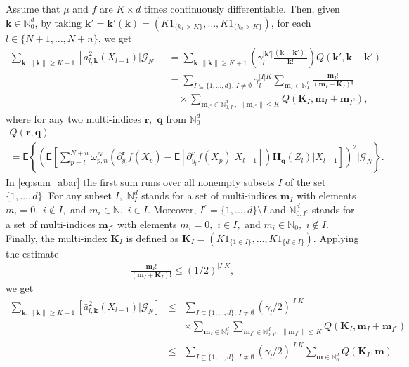 \documentclass[aap,preprint]{imsart}
\begin{document}
Assume that $\mu$ and $f$ are $K\times d$ times continuously differentiable.
Then, given $\mathbf k\in\mathbb N_0^d$,
by taking $\mathbf k'= \mathbf k'(\mathbf k)
=(K1_{\{k_1>K\}},\ldots,K1_{\{k_d>K\}})$,
for each $l\in\{N+1,\ldots,N+n\}$, we get
\begin{align}
\label{eq:sum_abar}
\sum_{\mathbf{k}\colon\|\mathbf{k}\|\geq K+1}\left[\bar{a}_{l,\mathbf{k}}^{2}(X_{l-1})|\mathcal{G}_{N}\right] & =\sum_{\mathbf{k}\colon\|\mathbf{k}\|\geq K+1}\left(\gamma_{l}^{|\mathbf{k}'|}\frac{(\mathbf{k}-\mathbf{k}')!}{\mathbf{k}!}\right)Q(\mathbf{k}',\mathbf{k}-\mathbf{k}')\\
\nonumber
 & =\sum_{I\subseteq\{1,\ldots,d\},\, I\neq \emptyset}\gamma_{l}^{|I|K}\sum_{\mathbf{m}_{I}\in\mathbb{N}_{I}^{d}}\frac{\mathbf{m}_{I}!}{\left(\mathbf{m}_{I}+\mathbf{K}_{I}\right)!}
 \\
 \nonumber
 & \hspace{1em}\times\sum_{\mathbf{m}_{I^c}\in \mathbb{N}^d_{0,I^c},\,\|\mathbf{m}_{I^c}\|\leq K}Q(\mathbf{\mathbf{K}}_{I},\mathbf{m}_{I}+\mathbf{m}_{I^c}),
\end{align}
where for any two multi-indices \(\mathbf{r},\) \(\mathbf{q}\) from \(\mathbb{N}_0^d\)
\begin{multline*}
Q(\mathbf{r},\mathbf{q})
\\
=\mathsf{E}\left\{
\left(\mathsf{E}\left[\sum_{p=l}^{N+n}\omega_{p,n}^{N}\left(\partial_{y_{l}}^{\mathbf r}f\left(X_{p}\right)-\mathsf{E}\left[\partial_{y_{l}}^{\mathbf r}f\left(X_{p}\right)|X_{l-1}\right]\right)\mathbf{H}_{\mathbf{q}}(Z_{l})\Big|X_{l-1}\right]\right)^{2}
\Bigg|\mathcal G_N \right\}.
\end{multline*}
In \eqref{eq:sum_abar} the first sum runs over all nonempty subsets $I$ of the set $\{1,\ldots,d\}.$
For any subset $I,$ $\mathbb{N}_{I}^{d}$ stands for a set
of multi-indices $\mathbf{m}_{I}$ with elements $m_{i}=0,$ $i\not\in I,$
and $m_{i}\in\mathbb{N},$  $i\in I.$ Moreover, \(I^c=\{1,\ldots,d\}\setminus I\) and \(\mathbb{N}^d_{0,I^c}\) stands for a set
of multi-indices $\mathbf{m}_{I^c}$ with elements $m_{i}=0,$ $i\in I,$
and $m_{i}\in\mathbb{N}_0,$  $i\not\in I.$ Finally, the multi-index \(\mathbf{K}_I\) is defined as $\mathbf{\mathbf{K}}_{I}=(K1_{\{1\in I\}},\ldots,K1_{\{d\in I\}}).$
Applying the estimate
\begin{eqnarray*}
\frac{\mathbf{m}_{I}!}{\left(\mathbf{m}_{I}+\mathbf{K}_{I}\right)!}\leq (1/2)^{|I| K},
\end{eqnarray*}
we get
\begin{eqnarray*}
\sum_{\mathbf{k}\colon\|\mathbf{k}\|\geq K+1}\left[\bar{a}_{l,\mathbf{k}}^{2}(X_{l-1})|\mathcal{G}_{N}\right]&\leq &
\sum_{I\subseteq\{1,\ldots,d\},\, I\neq \emptyset} (\gamma_{l}/2)^{|I|K}
\\
&& \times\sum_{\mathbf{m}_{I}\in\mathbb{N}_{I}^{d}} \sum_{\mathbf{m}_{I^c}\in \mathbb{N}^d_{0,I^c},\,\|\mathbf{m}_{I^c}\|\leq K} Q(\mathbf{\mathbf{K}}_{I},\mathbf{m}_{I}+\mathbf{m}_{I^c})
\\
&\leq &
\sum_{I\subseteq\{1,\ldots,d\},\, I\neq \emptyset} (\gamma_{l}/2)^{|I|K} \sum_{\mathbf{m}\in\mathbb{N}_0^{d}} Q(\mathbf{\mathbf{K}}_{I},\mathbf{m}).
\end{eqnarray*}
\end{document}
